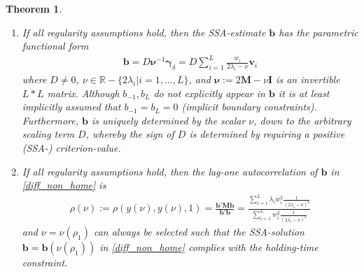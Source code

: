 \documentclass[a4paper]{article}
\newtheorem{Theorem}{Theorem}
\begin{document}
\begin{Theorem}
\begin{enumerate}
\item \label{ass1}If all regularity assumptions hold,  then the SSA-estimate $\mathbf{b}$ has the parametric functional form
\begin{eqnarray}\label{diff_non_home}
\mathbf{b}=D\boldsymbol{\nu}^{-1}\boldsymbol{\gamma}_{\delta}=D\sum_{i=1}^L \frac{w_i}{2\lambda_{i}-\nu}\mathbf{v}_{i}
\end{eqnarray}
where $D\neq 0$, $\nu\in \mathbb{R}-\{2\lambda_i|i=1,...,L\}$, and $\boldsymbol{\nu}:=2\mathbf{M}-\nu\mathbf{I}$ is an invertible $L*L$ matrix. Although $b_{-1},b_L$ do not explicitly appear in $\mathbf{b}$ it is at least implicitly assumed that $b_{-1}=b_L=0$ (implicit boundary constraints). Furthermore, $\mathbf{b}$ is uniquely determined by the scalar $\nu$, down to the arbitrary scaling term $D$, whereby the sign of $D$ is determined by requiring a positive (SSA-) criterion-value.


\item \label{ass3}If all regularity assumptions hold, then the lag-one autocorrelation of $\mathbf{b}$ in \ref{diff_non_home} is 
\begin{eqnarray}\label{rho_fd}
\rho(\nu):=\rho(y(\nu),y(\nu),1)=\frac{\mathbf{b}'\mathbf{Mb}}{\mathbf{b}'\mathbf{b}}=\frac{\sum_{i=1}^L\lambda_{i}w_i^2\frac{1}{(2\lambda_{i}-\nu)^2}}{\sum_{i=1}^Lw_i^2\frac{1}{(2\lambda_{i}-\nu)^2}}
\end{eqnarray}
and $\nu=\nu(\rho_1)$ can always be selected such that the SSA-solution $\mathbf{b}=\mathbf{b}(\nu(\rho_1))$ in \ref{diff_non_home} complies with the holding-time constraint.


\end{enumerate}
\end{Theorem}
\end{document}

